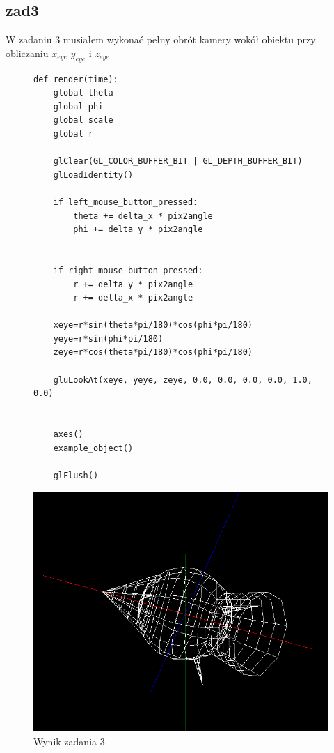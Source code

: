 \documentclass[]{article}
\begin{document}
\subsection{zad3}
W zadaniu 3 musiałem wykonać pełny obrót kamery wokół obiektu przy obliczaniu $x_{eye}$ $y_{eye}$ i  $z_{eye}$

\begin{figure}[H]
	\begin{verbatim}
def render(time):
    global theta
    global phi
    global scale
    global r

    glClear(GL_COLOR_BUFFER_BIT | GL_DEPTH_BUFFER_BIT)
    glLoadIdentity()
    
    if left_mouse_button_pressed:
        theta += delta_x * pix2angle
        phi += delta_y * pix2angle


    if right_mouse_button_pressed:
        r += delta_y * pix2angle
        r += delta_x * pix2angle

    xeye=r*sin(theta*pi/180)*cos(phi*pi/180)
    yeye=r*sin(phi*pi/180)
    zeye=r*cos(theta*pi/180)*cos(phi*pi/180)

    gluLookAt(xeye, yeye, zeye, 0.0, 0.0, 0.0, 0.0, 1.0, 0.0)


    axes()
    example_object()

    glFlush()
	\end{verbatim}
\end{figure}
\begin{figure}[H]

	\centering
	\includegraphics[width=\textwidth]{zad3.png}
	\caption{Wynik zadania 3}
\end{figure}
\end{document}

